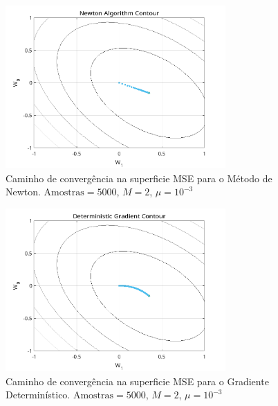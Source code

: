 \documentclass[a4paper,10pt]{article}
\begin{document}
\begin{enumerate}
				\newpage
				\begin{figure}[!ht]
					\centering
					\includegraphics[width=0.75\textwidth]{figs/newton_contour.png}
					\caption{Caminho de convergência na superficie MSE para o Método de Newton. $\text{Amostras} = 5000$, $M = 2$, $\mu = 10^{-3}$}
					\label{fig:newton_contour}
				\end{figure}
				
				\begin{figure}[!ht]
					\centering
					\includegraphics[width=0.75\textwidth]{figs/gradient_contour.png}
					\caption{Caminho de convergência na superficie MSE para o Gradiente Determinístico. $\text{Amostras} = 5000$, $M = 2$, $\mu = 10^{-3}$}
					\label{fig:gradient_contour}
				\end{figure}


\end{enumerate}
\end{document}
